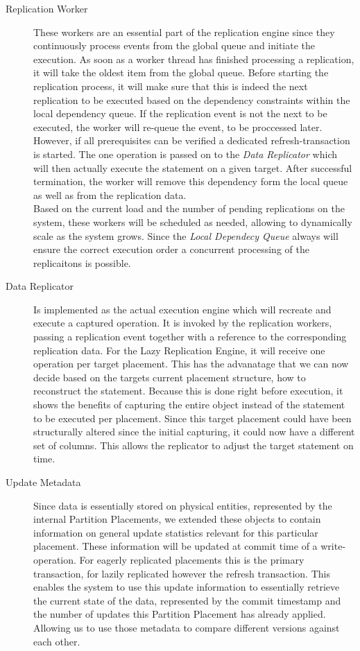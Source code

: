 \begin{description}
    \item[Replication Worker] These workers are an essential part of the replication engine since they continuously process events from the global queue 
    and initiate the execution. As soon as a worker thread has finished processing a replication, it will take the oldest item from the global queue. 
    Before starting the replication process, it will make sure that this is indeed the next replication to be executed based on the dependency constraints
    within the local dependency queue. If the replication event is not the next to be executed, the worker will re-queue the event, to be proccessed later.
    However, if all prerequisites can be verified a dedicated refresh-transaction is started.
    The one operation is passed on to the \emph{Data Replicator} which will then actually execute the statement on a given target.
    After successful termination, the worker will remove this dependency form the local queue as well as from the replication data. \\
    Based on the current load and the number of pending replications on the system, these workers will be scheduled as needed, allowing to dynamically scale as the system grows.
    Since the \emph{Local Dependecy Queue} always will ensure the correct execution order a concurrent processing of the replicaitons is possible.     
    


    \item[Data Replicator] Is implemented as the actual execution engine which will recreate and execute a captured operation. 
    It is invoked by the replication workers, passing a replication event together with a reference to the corresponding replication data.
    For the Lazy Replication Engine, it will receive one operation per target placement. 
    This has the advanatage that we can now decide based on the targets current placement structure, how to reconstruct the statement. 
    Because this is done right before execution, it shows the benefits of capturing the entire object instead of the statement to be executed per placement. 
    Since this target placement could have been structurally altered since the initial capturing, it could now have a different set of columns. 
    This allows the replicator to adjust the target statement on time.
    
    



    \item[Update Metadata] Since data is essentially stored on physical entities, represented by the internal Partition Placements, we extended these objects 
    to contain information on general update statistics relevant for this particular placement. These information will be updated at commit time of a write-operation.
    For eagerly replicated placements this is the primary transaction, for lazily replicated however the refresh transaction.
    This enables the system to use this update information to essentially retrieve the current state of the data, represented by the commit timestamp
    and the number of updates this Partition Placement has already applied. Allowing us to use those metadata to compare different versions against each other.


\end{description}
